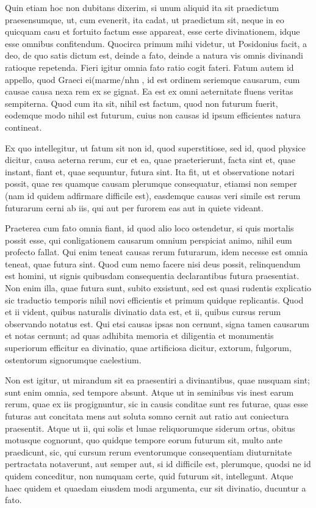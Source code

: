 Quin etiam hoc non dubitans dixerim, si unum aliquid ita sit praedictum praesensumque, ut, cum evenerit, ita cadat, ut praedictum sit, neque in eo quicquam casu et fortuito factum esse appareat, esse certe divinationem, idque esse omnibus confitendum. Quocirca primum mihi videtur, ut Posidonius facit, a deo, de quo satis dictum est, deinde a fato, deinde a natura vis omnis divinandi ratioque repetenda. Fieri igitur omnia fato ratio cogit fateri. Fatum autem id appello, quod Graeci ei(marme/nhn , id est ordinem seriemque causarum, cum causae causa nexa rem ex se gignat. Ea est ex omni aeternitate fluens veritas sempiterna. Quod cum ita sit, nihil est factum, quod non futurum fuerit, eodemque modo nihil est futurum, cuius non causas id ipsum efficientes natura contineat.

 Ex quo intellegitur, ut fatum sit non id, quod superstitiose, sed id, quod physice dicitur, causa aeterna rerum, cur et ea, quae praeterierunt, facta sint et, quae instant, fiant et, quae sequuntur, futura sint. Ita fit, ut et observatione notari possit, quae res quamque causam plerumque consequatur, etiamsi non semper (nam id quidem adfirmare difficile est), easdemque causas veri simile est rerum futurarum cerni ab iis, qui aut per furorem eas aut in quiete videant.

 Praeterea cum fato omnia fiant, id quod alio loco ostendetur, si quis mortalis possit esse, qui conligationem causarum omnium perspiciat animo, nihil eum profecto fallat. Qui enim teneat causas rerum futurarum, idem necesse est omnia teneat, quae futura sint. Quod cum nemo facere nisi deus possit, relinquendum est homini, ut signis quibusdam consequentia declarantibus futura praesentiat. Non enim illa, quae futura sunt, subito exsistunt, sed est quasi rudentis explicatio sic traductio temporis nihil novi efficientis et primum quidque replicantis. Quod et ii vident, quibus naturalis divinatio data est, et ii, quibus cursus rerum observando notatus est. Qui etsi causas ipsas non cernunt, signa tamen causarum et notas cernunt; ad quas adhibita memoria et diligentia et monumentis superiorum efficitur ea divinatio, quae artificiosa dicitur, extorum, fulgorum, ostentorum signorumque caelestium.

 Non est igitur, ut mirandum sit ea praesentiri a divinantibus, quae nusquam sint; sunt enim omnia, sed tempore absunt. Atque ut in seminibus vis inest earum rerum, quae ex iis progignuntur, sic in causis conditae sunt res futurae, quas esse futuras aut concitata mens aut soluta somno cernit aut ratio aut coniectura praesentit. Atque ut ii, qui solis et lunae reliquorumque siderum ortus, obitus motusque cognorunt, quo quidque tempore eorum futurum sit, multo ante praedicunt, sic, qui cursum rerum eventorumque consequentiam diuturnitate pertractata notaverunt, aut semper aut, si id difficile est, plerumque, quodsi ne id quidem conceditur, non numquam certe, quid futurum sit, intellegunt. Atque haec quidem et quaedam eiusdem modi argumenta, cur sit divinatio, ducuntur a fato.

